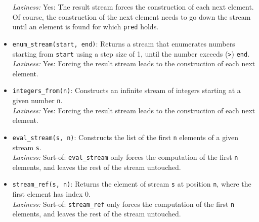 \begin{itemize}
\emph{Laziness:}  Yes: The result stream forces the construction of
            each next element. Of course, the construction
            of the next element needs to go down the stream
            until an element is found for which \lstinline{pred} holds.
\item \lstinline{enum_stream(start, end)}: Returns a stream that enumerates
numbers starting from \lstinline{start} using a step size of 1, until
the number exceeds (\lstinline{>}) \lstinline{end}.\\
 \emph{Laziness:}  Yes: Forcing the result stream leads to the construction of
            each next element.
\item \lstinline{integers_from(n)}: Constructs an infinite stream of integers
starting at a given number \lstinline{n}.\\
 \emph{Laziness:}  Yes: Forcing the result stream leads to the construction of 
            each next element.
\item \lstinline{eval_stream(s, n)}: Constructs the list
of the first \lstinline{n} elements
of a given stream \lstinline{s}.\\
\emph{Laziness:}  Sort-of: \lstinline{eval_stream} only forces the computation of
                the first \lstinline{n} elements, and leaves the rest of
                the stream untouched.
\item \lstinline{stream_ref(s, n)}: Returns the element
of stream \lstinline{s} at position \lstinline{n}, 
where the first element has index 0.\\
 \emph{Laziness:}  Sort-of: \lstinline{stream_ref} only forces the computation of
                the first \lstinline{n} elements, and leaves the rest of
                the stream untouched.
\end{itemize}
